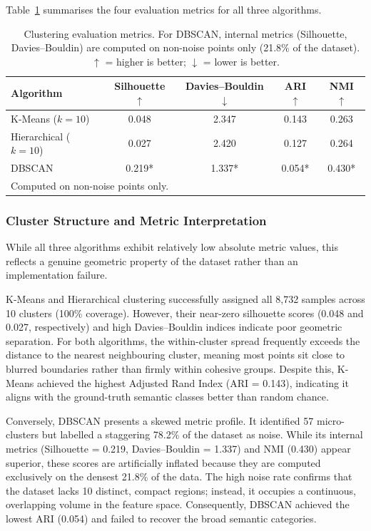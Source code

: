 \documentclass[runningheads,a4paper,11pt]{report}
\begin{document}
Table~\ref{tab:metrics} summarises the four evaluation metrics for all three algorithms.

\begin{table}[htbp]
    \centering
    \caption{Clustering evaluation metrics. For DBSCAN, internal metrics (Silhouette, Davies--Bouldin) are computed on non-noise points only (21.8\% of the dataset). $\uparrow$ = higher is better; $\downarrow$ = lower is better.}
    \label{tab:metrics}
    \begin{tabular}{lcccc}
        \hline
        \textbf{Algorithm} & \textbf{Silhouette} $\uparrow$ & \textbf{Davies--Bouldin} $\downarrow$ & \textbf{ARI} $\uparrow$ & \textbf{NMI} $\uparrow$ \\
        \hline
        K-Means ($k=10$)       & 0.048  & 2.347  & 0.143  & 0.263  \\
        Hierarchical ($k=10$)  & 0.027  & 2.420  & 0.127  & 0.264  \\
        DBSCAN                 & 0.219* & 1.337* & 0.054* & 0.430* \\
        \hline
        \multicolumn{5}{l}{\small * Computed on non-noise points only.}
    \end{tabular}
\end{table}

\subsubsection{Cluster Structure and Metric Interpretation}

While all three algorithms exhibit relatively low absolute metric values, this reflects a genuine geometric property of the dataset rather than an implementation failure.

K-Means and Hierarchical clustering successfully assigned all 8,732 samples across 10 clusters (100\% coverage). However, their near-zero silhouette scores (0.048 and 0.027, respectively) and high Davies--Bouldin indices indicate poor geometric separation. For both algorithms, the within-cluster spread frequently exceeds the distance to the nearest neighbouring cluster, meaning most points sit close to blurred boundaries rather than firmly within cohesive groups. Despite this, K-Means achieved the highest Adjusted Rand Index (ARI = 0.143), indicating it aligns with the ground-truth semantic classes better than random chance.

Conversely, DBSCAN presents a skewed metric profile. It identified 57 micro-clusters but labelled a staggering 78.2\% of the dataset as noise. While its internal metrics (Silhouette = 0.219, Davies--Bouldin = 1.337) and NMI (0.430) appear superior, these scores are artificially inflated because they are computed exclusively on the densest 21.8\% of the data. The high noise rate confirms that the dataset lacks 10 distinct, compact regions; instead, it occupies a continuous, overlapping volume in the feature space. Consequently, DBSCAN achieved the lowest ARI (0.054) and failed to recover the broad semantic categories.
\end{document}
